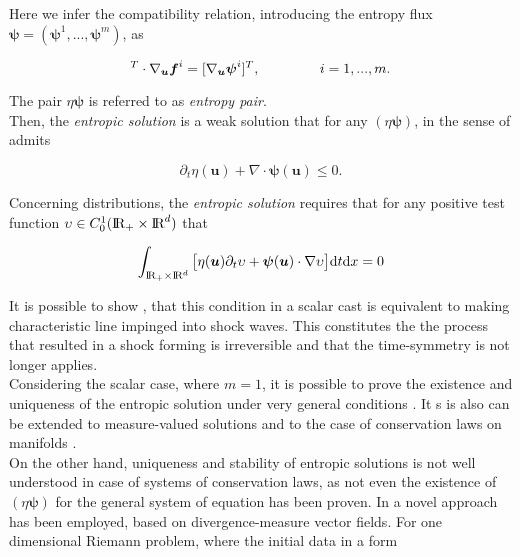 \documentclass[11pt,a4paper,headinclude=true,DIV=14,BCOR=8mm,chapterprefix,listof=totoc,twoside,openright,abstracton]{scrbook}
\begin{document}
Here we infer the compatibility relation, introducing the entropy flux $\boldsymbol{\psi} = (\boldsymbol{\psi}^1,...,\boldsymbol{\psi}^m)$, as 

\begin{equation}
    [\nabla_{\boldsymbol{u}}\eta]^T\cdot\nabla_{\boldsymbol{u}}\boldsymbol{f}^i = [\nabla_{\boldsymbol{u}}\boldsymbol{\psi}^i]^T, \hspace{15mm} i = 1,...,m.
\end{equation}

The pair $\eta\boldsymbol{\psi}$ is referred to as \textit{entropy pair}. \\

Then, the \textit{entropic solution} is a weak solution that for any $(\eta\boldsymbol{\psi})$, in the sense of   admits

\begin{equation}
    \partial_t\eta(\boldsymbol{u}) + \nabla\cdot\boldsymbol{\psi}(\boldsymbol{u})\leq 0.
\end{equation}

Concerning distributions, the \textit{entropic solution} requires that for any positive test function $\upsilon\in C_0 ^1 (\text{I\!R}_+\times\text{I\!R}^d)$ that 

\begin{equation}
    \int_{\text{I\!R}_+\times\text{I\!R}^d} \big[\eta(\boldsymbol{u})\partial_t\upsilon + \boldsymbol{\psi}(\boldsymbol{u}) \cdot \nabla\upsilon \big]\text{d}t\text{d}x = 0
\end{equation}

It is possible to show \cite{LeVeque:1992}, that this condition in a scalar cast is equivalent to making characteristic line impinged into shock waves. This constitutes the the process that resulted in a shock forming is irreversible and that the time-symmetry is not longer applies. \\

Considering the scalar case, where $m=1$, it is possible to prove the existence and uniqueness of the entropic solution under very general conditions \cite{Kruzkov:1970}. It s is also can be extended to measure-valued solutions \cite{DiPerna:1985} and to the case of conservation laws on manifolds \cite{Benartzi:2007}. \\

On the other hand, uniqueness and stability of entropic solutions is not well understood in case of systems of conservation laws, as not even the existence of $(\eta\boldsymbol{\psi})$ for the general system of equation has been proven. In \cite{Chen:2009} a novel approach has been employed, based on divergence-measure vector fields. For one dimensional
Riemann problem, where the initial data in a form 
\end{document}

